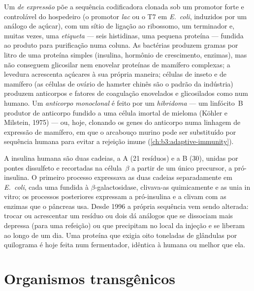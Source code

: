 \begin{definition}\label{def:b3:genetic-engineering:expression}
Um \emph{ de expressão} põe a sequência codificadora clonada sob
um promotor forte e controlável do hospedeiro (o promotor \emph{lac} ou
o T7 em \emph{E.~coli}, induzidos por um análogo de açúcar), com um
sítio de ligação ao ribossomo, um terminador e, muitas vezes, uma
\emph{etiqueta} --- seis histidinas, uma pequena proteína --- fundida ao
produto para purificação numa coluna. As bactérias produzem gramas por
litro de uma proteína simples (insulina, hormônio de crescimento,
enzimas), mas não conseguem glicosilar nem enovelar proteínas de
mamífero complexas; a levedura acrescenta açúcares à sua própria
maneira; células de inseto e de mamífero (as células de ovário de
hamster chinês são o padrão da indústria) produzem anticorpos e fatores
de coagulação enovelados e glicosilados como num humano. Um
\emph{anticorpo monoclonal} é feito por um \emph{hibridoma} --- um
linfócito~B produtor de anticorpo fundido a uma célula imortal de
mieloma (Köhler e Milstein, 1975) --- ou, hoje, clonando os genes do
anticorpo numa linhagem de expressão de mamífero, em que o arcabouço
murino pode ser substituído por sequência humana para evitar a rejeição
imune (\cref{ch:b3:adaptive-immunity}).
\end{definition}

\begin{example}[Insulina]\label{ex:b3:genetic-engineering:insulin}
A insulina humana são duas cadeias, a A (21 resíduos) e a B (30),
unidas por pontes dissulfeto e recortadas na célula~$\beta$ a partir de
um único precursor, a pró-insulina. O primeiro processo expressava as
duas cadeias separadamente em \emph{E.~coli}, cada uma fundida à
$\beta$-galactosidase, clivava-as quimicamente e as unia in vitro; os
processos posteriores expressam a pró-insulina e a clivam com as
enzimas que o pâncreas usa. Desde 1996 a própria sequência vem sendo
alterada: trocar ou acrescentar um resíduo ou dois dá análogos que se
dissociam mais depressa (para uma refeição) ou que precipitam no local
da injeção e se liberam ao longo de um dia. Uma proteína que exigia
oito toneladas de glândulas por quilograma é hoje feita num
fermentador, idêntica à humana ou melhor que ela.
\end{example}

\section{Organismos transgênicos}

